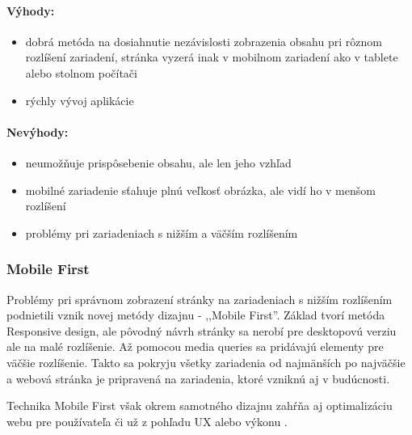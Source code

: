
\paragraph{Výhody:}
\begin{itemize}
	\item dobrá metóda na dosiahnutie nezávislosti zobrazenia obsahu pri rôznom rozlíšení zariadení, stránka vyzerá inak v mobilnom zariadení ako v tablete alebo stolnom počítači
	\item rýchly vývoj aplikácie
\end{itemize}

\paragraph{Nevýhody:}
\begin{itemize}
	\item neumožňuje prispôsebenie obsahu, ale len jeho vzhľad
	\item mobilné zariadenie sťahuje plnú veľkosť obrázka, ale vidí ho v menšom rozlíšení
	\item problémy pri zariadeniach s nižším a väčším rozlíšením
\end{itemize}



\subsubsection{Mobile First} %
\label{ssub:mobile_first_responsive_design}

Problémy pri správnom zobrazení stránky na zariadeniach s nižším rozlíšením podnietili vznik novej metódy dizajnu - ,,Mobile First''. Základ tvorí metóda Responsive design, ale pôvodný návrh stránky sa nerobí pre desktopovú verziu ale na malé rozlíšenie. Až pomocou media queries sa pridávajú elementy pre väčšie rozlíšenie. Takto sa pokryju všetky zariadenia od najmänších po najväčšie a webová stránka je pripravená na zariadenia, ktoré vzniknú aj v budúcnosti.

Technika Mobile First však okrem samotného dizajnu zahŕňa aj optimalizáciu webu pre používateľa či už z pohľadu UX alebo výkonu \cite{mobilefirst}.

